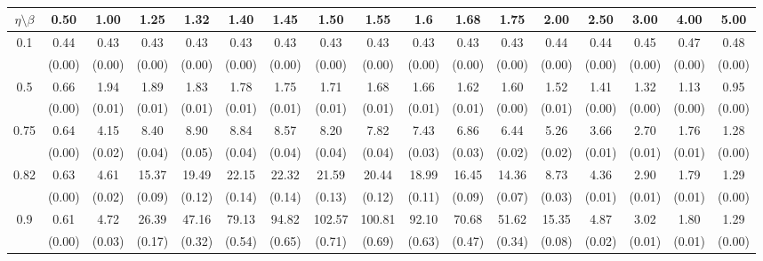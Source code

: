 \documentclass[12pt]{article}  %
\theoremstyle{plain}
\begin{document}
\begin{sidewaystable}[htbp]
\centering
{}
\label{ATS_10-7}
\ \\
\begin{tabular}{ccccccccccccccccc}
\hline
$\eta \setminus \beta $        & 0.50   & 1.00   & 1.25   & 1.32   & 1.40   & 1.45   & 1.50   & 1.55   & 1.6   & 1.68   & 1.75   & 2.00   & 2.50   & 3.00   & 4.00  &5.00 \\ \hline
\multirow{2}{*}{0.1}  & 0.44 &0.43 & 0.43 & 0.43  & 0.43  & 0.43  & 0.43  & 0.43  & 0.43  & 0.43  & 0.43 & 0.44 & 0.44 & 0.45 & 0.47&  0.48\\
                      & (0.00) & (0.00) & (0.00) & (0.00) & (0.00) & (0.00) & (0.00) & (0.00) & (0.00) & (0.00) & (0.00) & (0.00) & (0.00) & (0.00) & (0.00) & (0.00)\\ \hline
\multirow{2}{*}{0.5}  & 0.66 &1.94 & 1.89 & 1.83 &  1.78 &  1.75  & 1.71 &  1.68  & 1.66 &  1.62  & 1.60 & 1.52 & 1.41 & 1.32 & 1.13 & 0.95 \\
                      & (0.00) & (0.01) & (0.01) & (0.01) & (0.01) & (0.01) & (0.01) & (0.01) & (0.01) & (0.01) & (0.00) & (0.01)  & (0.00) & (0.00) & (0.00)&(0.00)\\ \hline
\multirow{2}{*}{0.75}  & 0.64 &4.15 & 8.40 & 8.90 &  8.84 &  8.57  & 8.20 &  7.82 &  7.43 &  6.86  & 6.44 & 5.26 & 3.66&  2.70 & 1.76 & 1.28\\
                      & (0.00)& (0.02)& (0.04)& (0.05)& (0.04)& (0.04)& (0.04)& (0.04)& (0.03)&  (0.03)&  (0.02)&  (0.02)&  (0.01)&  (0.01)&  (0.01)   &   (0.00)\\ \hline
\multirow{2}{*}{0.82}  & 0.63& 4.61&15.37 &19.49 & 22.15 & 22.32 & 21.59 & 20.44 & 18.99 & 16.45 & 14.36 & 8.73 & 4.36 & 2.90 & 1.79 & 1.29\\
                      & (0.00)& (0.02)& (0.09)& (0.12)& (0.14)& (0.14)& (0.13)& (0.12)& (0.11)&  (0.09)&  (0.07)&  (0.03)&  (0.01)&  (0.01)&  (0.01) &   (0.00)\\ \hline
\multirow{2}{*}{0.9}  &0.61& 4.72 &26.39 &47.16&  79.13 & 94.82& 102.57& 100.81 & 92.10  &70.68 & 51.62 &15.35 & 4.87 & 3.02 & 1.80 & 1.29\\
                      & (0.00)& (0.03)& (0.17)& (0.32)& (0.54)& (0.65)& (0.71)& (0.69)& (0.63)&  (0.47)&  (0.34)&  (0.08)&  (0.02)&  (0.01)&  (0.01) &   (0.00)\\ \hline                                               

\end{tabular}
\end{sidewaystable}
\end{document}
